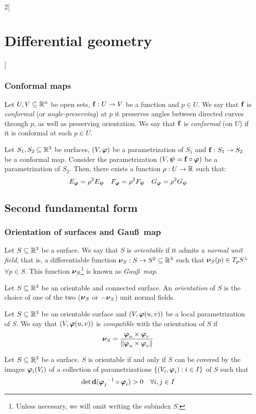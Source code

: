 \documentclass[../../../main.tex]{subfiles}
\begin{document}
\begin{multicols}{2}[\section{Differential geometry}]
  \subsubsection{Conformal maps}
  \begin{definition}
    Let $U,V\subseteq\mathbb{R}^n$ be open sets, $\boldsymbol{\mathrm{f}}:U\rightarrow V$ be a function and $p\in U$. We say that $\boldsymbol{\mathrm{f}}$ is \emph{conformal} (or \emph{angle-preserving}) at $p$ it preserves angles between directed curves through $p$, as well as preserving orientation. We say that $\boldsymbol{\mathrm{f}}$ is \emph{conformal} (on $U$) if it is conformal at each $p\in U$.
  \end{definition}
  \begin{theorem}
    Let $S_1,S_2\subseteq\mathbb{R}^3$ be surfaces, $(V,\boldsymbol{\mathrm{\varphi}})$ be a parametrization of $S_1$ and $\boldsymbol{\mathrm{f}}:S_1\rightarrow S_2$ be a conformal map. Consider the parametrization $(V,\boldsymbol{\mathrm{\psi}}=\boldsymbol{\mathrm{f}}\circ\boldsymbol{\mathrm{\varphi}})$ be a parametrization of $S_2$. Then, there exists a function $\rho:U\rightarrow\mathbb{R}$ such that:
    $$E_{\boldsymbol{\mathrm{\varphi}}}=\rho^2 E_{\boldsymbol{\mathrm{\psi}}}\quad F_{\boldsymbol{\mathrm{\varphi}}}=\rho^2 F_{\boldsymbol{\mathrm{\psi}}}\quad G_{\boldsymbol{\mathrm{\varphi}}}=\rho^2 G_{\boldsymbol{\mathrm{\psi}}}$$
  \end{theorem}
  \subsection{Second fundamental form}
  \subsubsection{Orientation of surfaces and Gau\ss\ map}
  \begin{definition}
    Let $S\subseteq\mathbb{R}^3$ be a surface. We say that $S$ is \emph{orientable} if it admits a \emph{normal unit field}, that is, a differentiable function $\boldsymbol{\mathrm{\nu}}_S:S\rightarrow S^2\subseteq\mathbb{R}^3$ such that $\boldsymbol{\mathrm{\nu}}_S(p)\in T_pS^\perp$ $\forall p\in S$. This function $\boldsymbol{\mathrm{\nu}}_S$\footnote{Unless necessary, we will omit writing the subindex $S$.} is known as \emph{Gau\ss\ map}.
  \end{definition}
  \begin{definition}
    Let $S\subseteq\mathbb{R}^3$ be an orientable and connected surface. An \emph{orientation} of $S$ is the choice of one of the two ($\boldsymbol{\mathrm{\nu}}_S$ or $-\boldsymbol{\mathrm{\nu}}_S$) unit normal fields.
  \end{definition}
  \begin{definition}
    Let $S\subseteq\mathbb{R}^3$ be an orientable surface and $(V,\boldsymbol{\mathrm{\varphi}}(u,v))$ be a local parametrization of $S$. We say that $(V,\boldsymbol{\mathrm{\varphi}}(u,v))$ is \emph{compatible} with the orientation of $S$ if $$\boldsymbol{\mathrm{\nu}}_S=\frac{\boldsymbol{\mathrm{\varphi}}_u\times\boldsymbol{\mathrm{\varphi}}_v}{\|\boldsymbol{\mathrm{\varphi}}_u\times\boldsymbol{\mathrm{\varphi}}_v\|}$$
  \end{definition}
  \begin{proposition}
    Let $S\subseteq\mathbb{R}^3$ be a surface. $S$ is orientable if and only if $S$ can be covered by the images $\boldsymbol{\mathrm{\varphi}}_i(V_i)$ of a collection of parametrizations $\{(V_i,\boldsymbol{\mathrm{\varphi}}_i):i\in I\}$ of $S$ such that $$\det\boldsymbol{\mathrm{\dd}}({\boldsymbol{\mathrm{\varphi}}_j}^{-1}\circ\boldsymbol{\mathrm{\varphi}}_i)>0\quad\forall i,j\in I$$
  \end{proposition}

\end{multicols}
\end{document}
